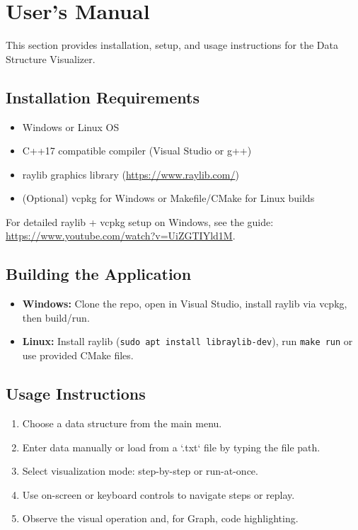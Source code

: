 \clearpage
\section{User's Manual}
\label{sec:manual}

This section provides installation, setup, and usage instructions for the Data Structure Visualizer.

\subsection{Installation Requirements}
\begin{itemize}
    \item Windows or Linux OS
    \item C++17 compatible compiler (Visual Studio or g++)
    \item raylib graphics library (\url{https://www.raylib.com/})
    \item (Optional) vcpkg for Windows or Makefile/CMake for Linux builds
\end{itemize}

For detailed raylib + vcpkg setup on Windows, see the guide:  
\url{https://www.youtube.com/watch?v=UiZGTIYld1M}.

\subsection{Building the Application}
\begin{itemize}
    \item \textbf{Windows:} Clone the repo, open in Visual Studio, install raylib via vcpkg, then build/run.
    \item \textbf{Linux:} Install raylib (\texttt{sudo apt install libraylib-dev}), run \texttt{make run} or use provided CMake files.
\end{itemize}

\subsection{Usage Instructions}
\begin{enumerate}
    \item Choose a data structure from the main menu.
    \item Enter data manually or load from a `.txt` file by typing the file path.
    \item Select visualization mode: step-by-step or run-at-once.
    \item Use on-screen or keyboard controls to navigate steps or replay.
    \item Observe the visual operation and, for Graph, code highlighting.
\end{enumerate}

